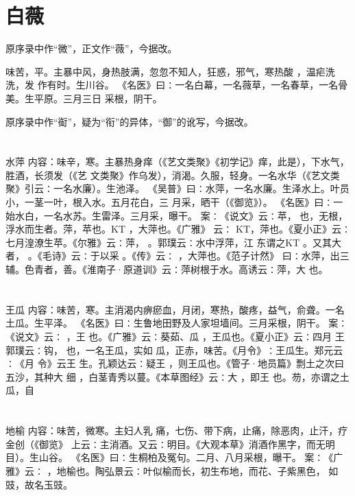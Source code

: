 \documentclass[12pt,UTF8]{ctexbook}
\begin{document}
\section{白薇}

原序录中作“微”，正文作“薇”，今据改。

味苦，平。主暴中风，身热肢满，忽忽不知人，狂惑，邪气，寒热酸 ，温疟洗洗，发 
作有时。生川谷。 
《名医》曰∶一名白幕，一名薇草，一名春草，一名骨美。生平原。三月三日 
采根，阴干。 

原序录中作“䘖”，疑为“衔”的异体，“御”的讹写，今据改。


\section{}水萍
内容：味辛，寒。主暴热身痒（《艺文类聚》《初学记》痒，此是），下水气，胜酒，长须发（《艺 
文类聚》作乌发），消渴。久服，轻身。一名水华（《艺文类聚》引云∶一名水廉）。生池泽。 
《吴普》曰∶水萍，一名水廉。生泽水上。叶员小，一茎一叶，根入水。五月花白，三 
月采，晒干（《御览》）。 
《名医》曰∶一始水白，一名水苏。生雷泽。三月采，曝干。 
案∶《说文》云∶苹， 也，无根，浮水而生者。萍，苹也。KT ，大萍也。《广雅》 
云∶ 
KT，萍也。《夏小正》云∶七月湟潦生苹。《尔雅》云∶萍， 。郭璞云∶水中浮萍，江 
东谓之KT 。又其大者， 。《毛诗》云∶于以采 。《传》云∶ ，大萍也。《范子计然》 
曰∶水萍，出三辅。色青者，善。《淮南子·原道训》云∶萍树根于水。高诱云∶萍，大 
也。 


\section{}王瓜
内容：味苦，寒。主消渴内痹瘀血，月闭，寒热，酸疼，益气，俞聋。一名土瓜。生平泽。 
《名医》曰∶生鲁地田野及人家坦墙间。三月采根，阴干。 
案∶《说文》云∶ ，王 也。《广雅》云∶葵茹、瓜 ，王瓜也。《夏小正》云∶四月 
王 
郭璞云∶钩， 也，一名王瓜，实如 瓜，正赤，味苦。《月令》∶王瓜生。郑元云∶《月 
令》云王 生。孔颖达云∶疑王 ，则王瓜也。《管子·地员篇》剽土之次曰五沙，其种大 
细 ，白茎青秀以蔓。《本草图经》云∶大 ，即王 也。芴，亦谓之土瓜，自 


\section{}地榆
内容：味苦，微寒。主妇人乳 痛，七伤、带下病，止痛，除恶肉，止汗，疗金创（《御览》 
上云∶主消酒。又云∶明目。《大观本草》消酒作黑字，而无明目）。生山谷。 
《名医》曰∶生桐柏及冤句。二月、八月采根，曝干。 
案∶《广雅》云∶ ，地榆也。陶弘景云∶叶似榆而长，初生布地，而花、子紫黑色， 
如豉，故名玉豉。 
\end{document}
